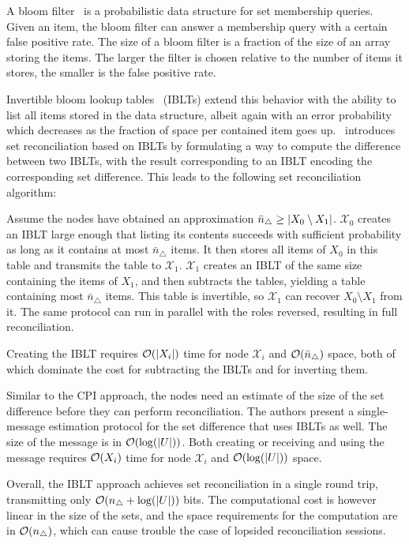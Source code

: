 A bloom filter~\cite{bloom1970space} is a probabilistic data structure for set membership queries. Given an item, the bloom filter can answer a membership query with a certain false positive rate. The size of a bloom filter is a fraction of the size of an array storing the items. The larger the filter is chosen relative to the number of items it stores, the smaller is the false positive rate.

Invertible bloom lookup tables~\cite{goodrich2011invertible} (IBLTs) extend this behavior with the ability to list all items stored in the data structure, albeit again with an error probability which decreases as the fraction of space per contained item goes up. \cite{eppstein2011s}~introduces set reconciliation based on IBLTs by formulating a way to compute the difference between two IBLTs, with the result corresponding to an IBLT encoding the corresponding set difference. This leads to the following set reconciliation algorithm:

Assume the nodes have obtained an approximation $\bar{n}_{\triangle} \geq |{X_0 \setminus X_1}|$. $\mathcal{X}_0$ creates an IBLT large enough that listing its contents succeeds with sufficient probability as long as it contains at most $\bar{n}_{\triangle}$ items. It then stores all items of $X_0$ in this table and transmits the table to $\mathcal{X}_1$. $\mathcal{X}_1$ creates an IBLT of the same size containing the items of $X_1$, and then subtracts the tables, yielding a table containing most $\bar{n}_{\triangle}$ items. This table is invertible, so $\mathcal{X}_1$ can recover $X_0 \setminus X_1$ from it. The same protocol can run in parallel with the roles reversed, resulting in full reconciliation.

Creating the IBLT requires $\mathcal{O}(|{X_i}|)$ time for node $\mathcal{X}_i$ and $\mathcal{O}(\bar{n}_{\triangle})$ space, both of which dominate the cost for subtracting the IBLTs and for inverting them.

Similar to the CPI approach, the nodes need an estimate of the size of the set difference before they can perform reconciliation. The authors present a single-message estimation protocol for the set difference that uses IBLTs as well. The size of the message is in $\mathcal{O}(\log(|{U}|))$. Both creating or receiving and using the message requires $\mathcal{O}(X_i)$ time for node $\mathcal{X}_i$ and $\mathcal{O}(\log(|{U}|))$ space.

Overall, the IBLT approach achieves set reconciliation in a single round trip, transmitting only $\mathcal{O}(n_{\triangle} + \log(|{U}|))$ bits. The computational cost is however linear in the size of the sets, and the space requirements for the computation are in $\mathcal{O}(n_{\triangle})$, which can cause trouble the case of lopsided reconciliation sessions.

